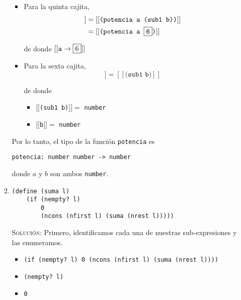 \documentclass[letterpaper,11pt]{article}
\begin{document}
\begin{enumerate}
\begin{enumerate}
\begin{itemize}
            \item Para la quinta cajita,
            \begin{align*}
                [[ \; \fbox{5} \; ]]
                &= [[\texttt{(potencia a (sub1 b))}]] \\
                &= [[\texttt{(potencia a \fbox{6})}]]
            \end{align*}

            de donde $[[\texttt{a} \rightarrow \fbox{6}]]$
            
            \item Para la sexta cajita,
            \begin{equation*}
                [[\; \fbox{6} \;]] = [[\texttt{(sub1 b)}]]
            \end{equation*}

            de donde 
            \begin{itemize}
                \item $[[$\texttt{(sub1 b)}$]] =$ \texttt{number}
                \item $[[$\texttt{b}$]] =$ \texttt{number}
            \end{itemize}
        \end{itemize}
        
        Por lo tanto, el tipo de la función \texttt{potencia} es 
        \begin{center}
            \texttt{potencia: number number -> number}
        \end{center}
        
        donde $a$ y $b$ son ambos \texttt{number}.
        
        \item \begin{verbatim}(define (suma l)
    (if (nempty? l)
        0
        (ncons (nfirst l) (suma (nrest l)))))
        \end{verbatim}

        \textsc{Solución:} Primero, identificamos cada una de nuestras 
        sub-expresiones y las enumeramos.
        \begin{itemize}
            \item {} \texttt{(if (nempty? l) 0 
            (ncons (nfirst l) (suma (nrest l))))}

            \item {} \texttt{(nempty? l)}
            
            \item {} \texttt{0}
            

\end{itemize}
\end{enumerate}
\end{enumerate}
\end{document}
